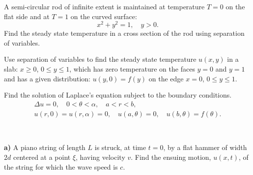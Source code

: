 {\begin{Exercise}
\end{Exercise}



\begin{Exercise}
  \label{exercise potential semi-circular rod}
  A semi-circular rod of infinite extent is maintained at temperature $T = 0$
  on the flat side and at $T = 1$ on the curved surface:
  \[
  x^2 + y^2 = 1, \quad y > 0.
  \]
  Find the steady state temperature in a cross section of the rod using
  separation of variables.

\end{Exercise}


\begin{Exercise}
  \label{exercise heat semi-infinite rectangular slab}
  Use separation of variables to find the steady state temperature 
  $u(x,y)$ in a slab: $x \geq 0$, 
  $0 \leq y \leq 1$, which has zero temperature on the faces $y = 0$ and
  $y = 1$ and has a given distribution: $u(y,0) = f(y)$ on the 
  edge $x = 0$, $0 \leq y \leq 1$.

\end{Exercise}



\begin{Exercise}
  \label{exercise harmonic sector inhomogeneous bc}
  Find the solution of Laplace's equation subject to the boundary conditions.
  \begin{gather*}
    \Delta u = 0, \quad 0 < \theta < \alpha, \quad a < r < b,
    \\
    u(r,0) = u(r,\alpha) = 0, \quad u(a,\theta) = 0, \quad u(b,\theta) = f(\theta).
  \end{gather*}

\end{Exercise}







\begin{Exercise}
  \label{exercise piano string instantaneously struck}
  $\phantom{a}$

  \textbf{a)}
  A piano string of length $L$ is struck, at time $t = 0$, by a flat hammer of
  width $2 d$ centered at a point $\xi$, having velocity $v$.  Find the ensuing
  motion, $u(x, t)$, of the string for which the wave speed is $c$.


\end{Exercise}}
